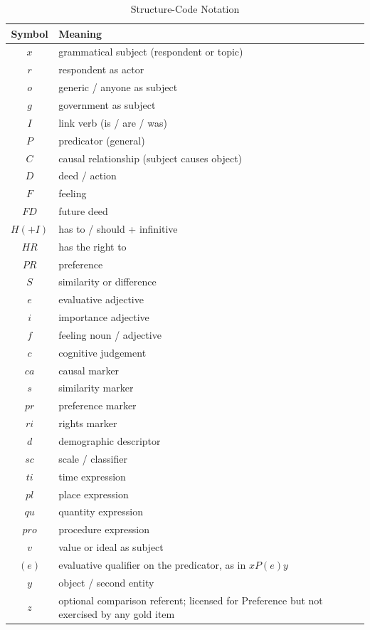 \documentclass[onecolumn, 11pt]{IEEEtran}
\begin{document}
\begin{table}[ht]
\caption{Structure-Code Notation}
\label{tab:notation}
\centering
\footnotesize
\begin{tabular}{c l}
\hline
\textbf{Symbol} & \textbf{Meaning} \\
\hline
$x$ & grammatical subject (respondent or topic) \\
$r$ & respondent as actor \\
$o$ & generic / anyone as subject \\
$g$ & government as subject \\
$I$ & link verb (is / are / was) \\
$P$ & predicator (general) \\
$C$ & causal relationship (subject causes object) \\
$D$ & deed / action \\
$F$ & feeling \\
$FD$ & future deed \\
$H({+}I)$ & has to / should + infinitive \\
$HR$ & has the right to \\
$PR$ & preference \\
$S$ & similarity or difference \\
$e$ & evaluative adjective \\
$i$ & importance adjective \\
$f$ & feeling noun / adjective \\
$c$ & cognitive judgement \\
$ca$ & causal marker \\
$s$ & similarity marker \\
$pr$ & preference marker \\
$ri$ & rights marker \\
$d$ & demographic descriptor \\
$sc$ & scale / classifier \\
$ti$ & time expression \\
$pl$ & place expression \\
$qu$ & quantity expression \\
$pro$ & procedure expression \\
$v$ & value or ideal as subject \\
$(e)$ & evaluative qualifier on the predicator, as in $xP(e)y$ \\
$y$ & object / second entity \\
$z$ & optional comparison referent; licensed for Preference but not exercised by any gold item \\
\hline
\end{tabular}
\end{table}
\end{document}
